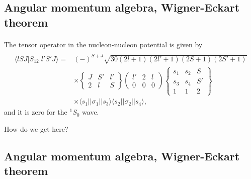 \documentclass[%
twoside,                 %
final,                   %
10pt]{article}
\begin{document}
\subsection*{Angular momentum algebra, Wigner-Eckart theorem}

\paragraph{}
The tensor operator in the nucleon-nucleon potential
is given by
\[
\begin{array}{ll}
&\\
\langle lSJ\vert S_{12}\vert l'S'J\rangle =&
(-)^{S+J}\sqrt{30(2l+1)(2l'+1)(2S+1)(2S'+1)}\\
&\times\left\{\begin{array}{ccc}J&S'&l'\\2&l&S\end{array}\right\}
\left(\begin{array}{ccc}l'&2&l\\0&0&0\end{array}\right)
\left\{\begin{array}{ccc}s_{1}&s_{2}&S\\s_{3}&s_{4}&S'\\
1&1&2\end{array}
\right\}\\
&\times\langle s_{1}\vert\vert \sigma_{1}\vert\vert s_{3}\rangle
\langle s_{2}\vert\vert \sigma_{2}\vert \vert s_{4}\rangle,
\end{array}
\]
and it is zero for the $^1S_0$ wave. 

How do we get here?


\subsection*{Angular momentum algebra, Wigner-Eckart theorem}

\end{document}
